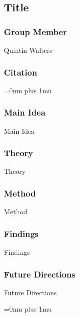 \noindent
\subsection{Title}

\subsubsection{Group Member}

\noindent
Quintin Walters

\noindent
\subsubsection{Citation}

\Urlmuskip=0mu plus 1mu\relax

\subsubsection{Main Idea}

\noindent
Main Idea

\subsubsection{Theory}

\noindent
Theory

\subsubsection{Method}

\noindent
Method

\subsubsection{Findings}

\noindent
Findings

\subsubsection{Future Directions}

\noindent
Future Directions 

\Urlmuskip=0mu plus 1mu\relax
\pagebreak
